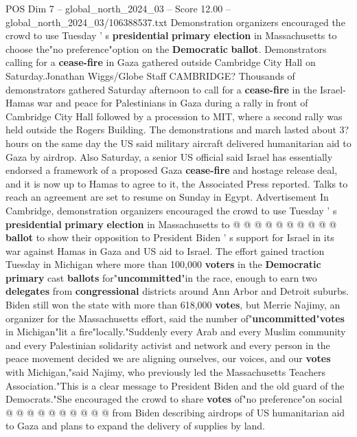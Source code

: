 \begin{textsample}{POS Dim 7 – global\_north\_2024\_03 – Score 12.00 – global\_north\_2024\_03/106388537.txt}  \label{ex:f7_pos_040}
Demonstration organizers encouraged the crowd to use Tuesday ' s \textbf{presidential} \textbf{primary} \textbf{election} in Massachusetts to choose the"no preference"option on the \textbf{Democratic} \textbf{ballot}.
Demonstrators calling for a \textbf{cease-fire} in Gaza gathered outside Cambridge City Hall on Saturday.Jonathan Wiggs/Globe Staff CAMBRIDGE?
Thousands of demonstrators gathered Saturday afternoon to call for a \textbf{cease-fire} in the Israel-Hamas war and peace for Palestinians in Gaza during a rally in front of Cambridge City Hall followed by a procession to MIT, where a second rally was held outside the Rogers Building.
The demonstrations and march lasted about 3? hours on the same day the US said military aircraft delivered humanitarian aid to Gaza by airdrop.
Also Saturday, a senior US official said Israel has essentially endorsed a framework of a proposed Gaza \textbf{cease-fire} and hostage release deal, and it is now up to Hamas to agree to it, the Associated Press reported.
Talks to reach an agreement are set to resume on Sunday in Egypt.
Advertisement In Cambridge, demonstration organizers encouraged the crowd to use Tuesday ' s \textbf{presidential} \textbf{primary} \textbf{election} in Massachusetts to @ @ @ @ @ @ @ @ @ @ \textbf{ballot} to show their opposition to President Biden ' s support for Israel in its war against Hamas in Gaza and US aid to Israel.
The effort gained traction Tuesday in Michigan where more than 100,000 \textbf{voters} in the \textbf{Democratic} \textbf{primary} cast \textbf{ballots} for"\textbf{uncommitted}"in the race, enough to earn two \textbf{delegates} from \textbf{congressional} districts around Ann Arbor and Detroit suburbs.
Biden still won the state with more than 618,000 \textbf{votes}, but Merrie Najimy, an organizer for the Massachusetts effort, said the number of"\textbf{uncommitted}"\textbf{votes} in Michigan"lit a fire"locally."Suddenly every Arab and every Muslim community and every Palestinian solidarity activist and network and every person in the peace movement decided we are aligning ourselves, our voices, and our \textbf{votes} with Michigan,"said Najimy, who previously led the Massachusetts Teachers Association."This is a clear message to President Biden and the old guard of the Democrats."She encouraged the crowd to share \textbf{votes} of"no preference"on social @ @ @ @ @ @ @ @ @ @ from Biden describing airdrops of US humanitarian aid to Gaza and plans to expand the delivery of supplies by land.

\end{textsample}
